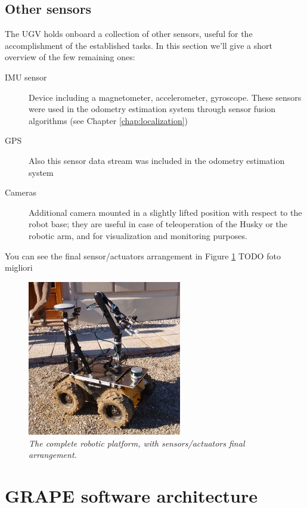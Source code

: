 \subsection{Other sensors}
The \ac{UGV} holds onboard a collection of other sensors, useful for the accomplishment of the established tasks. In this section we'll give a short overview of the few remaining ones:
\begin{description}
	\item[{IMU} sensor] Device including a magnetometer, accelerometer, gyroscope. These sensors were used in the odometry estimation system through sensor fusion algorithms (see Chapter \ref{chap:localization})
	\item[GPS] Also this sensor data stream was included in the odometry estimation system
	\item [Cameras] Additional camera mounted in a slightly lifted position with respect to the robot base; they are useful in case of teleoperation of the Husky or the robotic arm, and for visualization and monitoring purposes.
\end{description}

You can see the final sensor/actuators arrangement in Figure \ref{fig:disposizioneFinale} TODO foto migliori
\begin{figure}
	\centering
	\includegraphics[width=0.6\textwidth]{Images/grape_sw_hw_architecture/disposizioneFinale.jpeg}
	\caption{\textit{The complete robotic platform, with sensors/actuators final arrangement.}}
	\label{fig:disposizioneFinale}
\end{figure}
 
\section{GRAPE software architecture}\label{sec:grapeSwArch}


